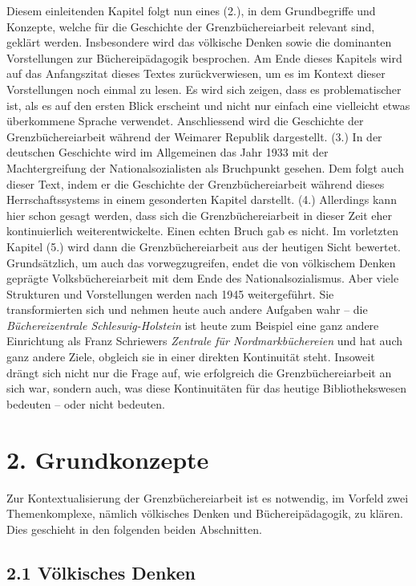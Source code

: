 \documentclass[a4paper,
fontsize=11pt,
oneside,
numbers=noperiodatend,
parskip=half-,
bibliography=totoc,
final
]{scrartcl}
\begin{document}
Diesem einleitenden Kapitel folgt nun eines (2.), in dem Grundbegriffe
und Konzepte, welche für die Geschichte der Grenzbüchereiarbeit relevant
sind, geklärt werden. Insbesondere wird das völkische Denken sowie die
dominanten Vorstellungen zur Büchereipädagogik besprochen. Am Ende
dieses Kapitels wird auf das Anfangszitat dieses Textes zurückverwiesen,
um es im Kontext dieser Vorstellungen noch einmal zu lesen. Es wird sich
zeigen, dass es problematischer ist, als es auf den ersten Blick
erscheint und nicht nur einfach eine vielleicht etwas überkommene
Sprache verwendet. Anschliessend wird die Geschichte der
Grenzbüchereiarbeit während der Weimarer Republik dargestellt. (3.) In
der deutschen Geschichte wird im Allgemeinen das Jahr 1933 mit der
Machtergreifung der Nationalsozialisten als Bruchpunkt gesehen. Dem
folgt auch dieser Text, indem er die Geschichte der Grenzbüchereiarbeit
während dieses Herrschaftssystems in einem gesonderten Kapitel
darstellt. (4.) Allerdings kann hier schon gesagt werden, dass sich die
Grenzbüchereiarbeit in dieser Zeit eher kontinuierlich
weiterentwickelte. Einen echten Bruch gab es nicht. Im vorletzten
Kapitel (5.) wird dann die Grenzbüchereiarbeit aus der heutigen Sicht
bewertet. Grundsätzlich, um auch das vorwegzugreifen, endet die von
völkischem Denken geprägte Volksbüchereiarbeit mit dem Ende des
Nationalsozialismus. Aber viele Strukturen und Vorstellungen werden nach
1945 weitergeführt. Sie transformierten sich und nehmen heute auch
andere Aufgaben wahr -- die \emph{Büchereizentrale Schleswig-Holstein}
ist heute zum Beispiel eine ganz andere Einrichtung als Franz Schriewers
\emph{Zentrale für Nordmarkbüchereien} und hat auch ganz andere Ziele,
obgleich sie in einer direkten Kontinuität steht. Insoweit drängt sich
nicht nur die Frage auf, wie erfolgreich die Grenzbüchereiarbeit an sich
war, sondern auch, was diese Kontinuitäten für das heutige
Bibliothekswesen bedeuten -- oder nicht bedeuten.

\hypertarget{grundkonzepte}{%
\section{2. Grundkonzepte}\label{grundkonzepte}}

Zur Kontextualisierung der Grenzbüchereiarbeit ist es notwendig, im
Vorfeld zwei Themenkomplexe, nämlich völkisches Denken und
Büchereipädagogik, zu klären. Dies geschieht in den folgenden beiden
Abschnitten.

\hypertarget{vuxf6lkisches-denken}{%
\subsection{2.1 Völkisches Denken}\label{vuxf6lkisches-denken}}
\end{document}
